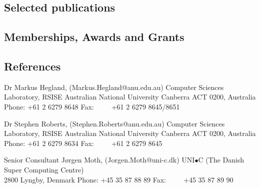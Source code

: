\documentclass[12pt,a4paper]{article}
\begin{document}
\newpage
\subsection*{Selected publications}


\subsection*{Memberships, Awards and Grants}


%


\newpage
\subsection*{References}

\noindent Dr Markus Hegland, (Markus.Hegland@anu.edu.au)\newline
Computer Sciences Laboratory, RSISE \newline
Australian National University \newline
Canberra ACT 0200, Australia \newline
Phone: +61 2 6279 8648 \newline
Fax:\ \ \ \ \  +61 2 6279 8645/8651 \newline

\noindent Dr Stephen Roberts, (Stephen.Roberts@anu.edu.au)\newline
Computer Sciences Laboratory, RSISE \newline
Australian National University \newline
Canberra ACT 0200, Australia \newline
Phone: +61 2 6279 8634 \newline
Fax:\ \ \ \ \  +61 2 6279 8645 \newline

\noindent Senior Consultant J{\o}rgen Moth, (Jorgen.Moth@uni-c.dk)\newline
UNI$\bullet$C (The Danish Super Computing Centre) \\
2800 Lyngby, Denmark \newline
Phone: +45 35 87 88 89 \newline
Fax:\ \ \ \ \  +45 35 87 89 90 \newline
\end{document}
